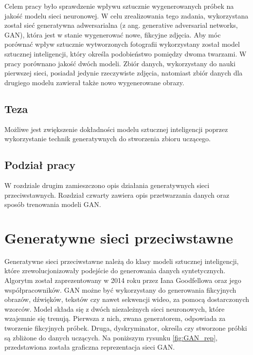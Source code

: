 \documentclass[eng,printmode]{mgr}
\begin{document}
Celem pracy było sprawdzenie wpływu sztucznie wygenerowanych próbek na jakość modelu sieci neuronowej. W celu zrealizowania tego zadania, wykorzystana został sieć generatywna adwersarialna (z ang. generative adversarial networks, GAN), która jest w stanie wygenerować nowe, fikcyjne zdjęcia. Aby móc porównać wpływ sztucznie wytworzonych fotografii wykorzystany został model sztucznej inteligencji, który określa podobieństwo pomiędzy dwoma twarzami. W pracy porównano jakość dwóch modeli. Zbiór danych, wykorzystany do nauki pierwszej sieci, posiadał jedynie rzeczywiste zdjęcia, natomiast zbiór danych dla drugiego modelu zawierał także nowo wygenerowane obrazy. 






\section{Teza}

Możliwe jest zwiększenie dokładności modelu sztucznej inteligencji poprzez wykorzystanie technik generatywnych do stworzenia zbioru uczącego.  


\section{Podział pracy}

W rozdziale drugim zamieszczono opis działania generatywnych sieci przeciwstawnych. Rozdział czwarty zawiera opis przetwarzania danych oraz sposób trenowania modeli GAN. 











\chapter{Generatywne sieci przeciwstawne}

Generatywne sieci przeciwstawne należą do klasy modeli sztucznej inteligencji, które zrewolucjonizowały podejście do generowania danych syntetycznych. Algorytm został zaprezentowany w 2014 roku przez Iana Goodfellowa oraz jego współpracowników. GAN możne być wykorzystany do generowania fikcyjnych obrazów, dźwięków, tekstów czy nawet sekwencji wideo, za pomocą dostarczonych wzorców. 
Model składa się z dwóch niezależnych sieci neuronowych, które wzajemnie się trenują. Pierwsza z nich, zwana generatorem, odpowiada za tworzenie fikcyjnych próbek. Druga, dyskryminator, określa czy stworzone próbki są zbliżone do danych uczących. Na poniższym rysunku \ref{fig:GAN_rep}, przedstawiona została graficzna reprezentacja sieci GAN.
\end{document}
